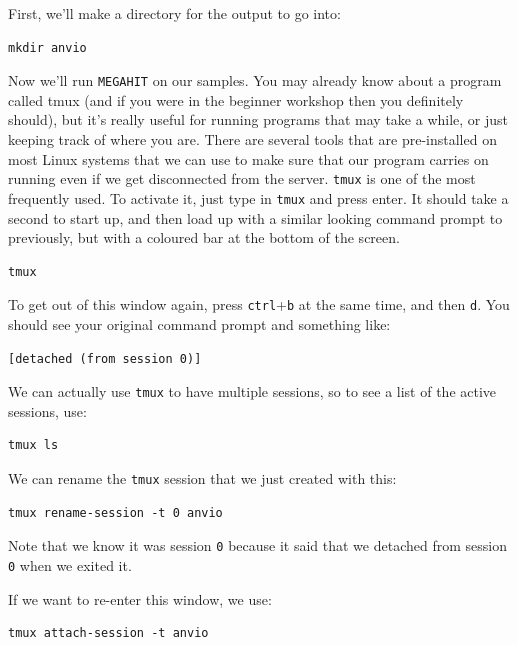 \documentclass[
]{book}
\begin{document}
First, we'll make a directory for the output to go into:

\begin{verbatim}
mkdir anvio
\end{verbatim}

Now we'll run \texttt{MEGAHIT} on our samples. You may already know about a program called tmux (and if you were in the beginner workshop then you definitely should), but it's really useful for running programs that may take a while, or just keeping track of where you are. There are several tools that are pre-installed on most Linux systems that we can use to make sure that our program carries on running even if we get disconnected from the server. \texttt{tmux} is one of the most frequently used. To activate it, just type in \texttt{tmux} and press enter. It should take a second to start up, and then load up with a similar looking command prompt to previously, but with a coloured bar at the bottom of the screen.

\begin{verbatim}
tmux
\end{verbatim}

To get out of this window again, press \texttt{ctrl}+\texttt{b} at the same time, and then \texttt{d}. You should see your original command prompt and something like:

\begin{verbatim}
[detached (from session 0)]
\end{verbatim}

We can actually use \texttt{tmux} to have multiple sessions, so to see a list of the active sessions, use:

\begin{verbatim}
tmux ls
\end{verbatim}

We can rename the \texttt{tmux} session that we just created with this:

\begin{verbatim}
tmux rename-session -t 0 anvio
\end{verbatim}

Note that we know it was session \texttt{0} because it said that we detached from session \texttt{0} when we exited it.

If we want to re-enter this window, we use:

\begin{verbatim}
tmux attach-session -t anvio
\end{verbatim}
\end{document}
